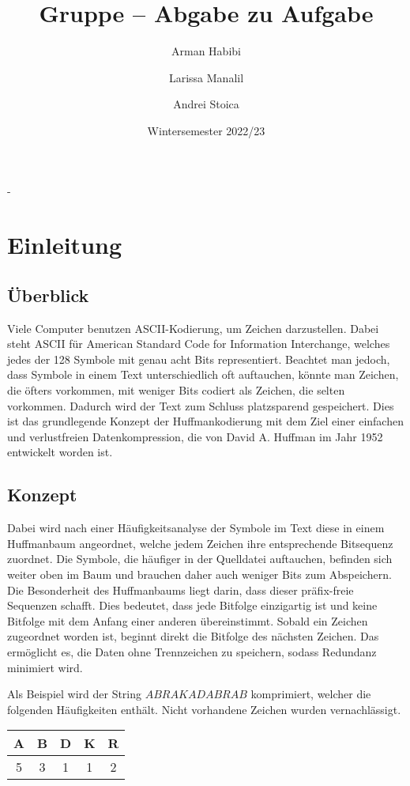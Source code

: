 \documentclass[course=erap]{aspdoc}
\author{Arman Habibi \and Larissa Manalil \and Andrei Stoica}
\date{Wintersemester 2022/23} %
\title{Gruppe \theGroup{} -- Abgabe zu Aufgabe \theNumber}
\begin{document}
-
\maketitle

\section{Einleitung}
\subsection{Überblick}

Viele Computer benutzen ASCII-Kodierung,%
um Zeichen darzustellen. Dabei steht ASCII für American Standard Code for Information Interchange, welches jedes der 128 Symbole mit genau acht Bits representiert. Beachtet man jedoch, dass Symbole in einem Text unterschiedlich oft auftauchen, könnte man Zeichen, die öfters vorkommen, mit weniger Bits codiert als Zeichen, die selten vorkommen. Dadurch wird der Text zum Schluss platzsparend gespeichert.
Dies ist das grundlegende Konzept der Huffmankodierung mit dem Ziel einer einfachen und verlustfreien Datenkompression, die von David A. Huffman im Jahr 1952 entwickelt worden ist.
\subsection{Konzept}
Dabei wird nach einer Häufigkeitsanalyse der Symbole im Text diese in einem Huffmanbaum angeordnet, welche jedem Zeichen ihre entsprechende Bitsequenz zuordnet. Die Symbole, die häufiger in der Quelldatei auftauchen, befinden sich weiter oben im Baum und brauchen daher auch weniger Bits zum Abspeichern. Die Besonderheit des Huffmanbaums liegt darin, dass dieser präfix-freie Sequenzen schafft.
Dies bedeutet, dass jede Bitfolge einzigartig ist und keine Bitfolge mit dem Anfang einer anderen übereinstimmt. Sobald ein Zeichen zugeordnet worden ist, beginnt direkt die Bitfolge des nächsten Zeichen. Das ermöglicht es, die Daten ohne Trennzeichen zu speichern, sodass Redundanz minimiert wird.

Als Beispiel wird der String $ABRAKADABRAB$ komprimiert, welcher die folgenden Häufigkeiten enthält. Nicht vorhandene Zeichen wurden vernachlässigt.

\begin{center}
    \begin{tabular}{ |c|c|c|c|c| }
     \hline
     A & B & D & K & R \\
     \hline
     5 & 3 & 1 & 1 & 2 \\
     \hline
    \end{tabular}
\end{center}
\end{document}
